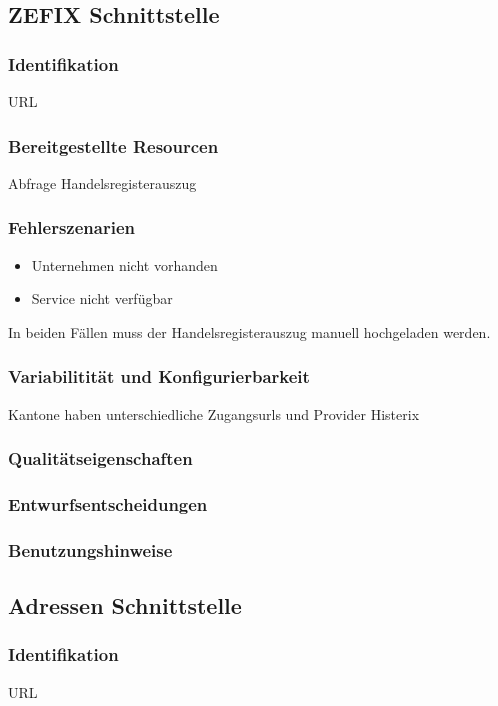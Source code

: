 \subsection{ZEFIX Schnittstelle}

\subsubsection{Identifikation}
URL
\subsubsection{Bereitgestellte Resourcen}
Abfrage Handelsregisterauszug

\subsubsection{Fehlerszenarien}
\begin{itemize}
	\item Unternehmen nicht vorhanden
	\item Service nicht verfügbar
\end{itemize}
In beiden Fällen muss der Handelsregisterauszug manuell hochgeladen werden.

\subsubsection{Variabilitität und Konfigurierbarkeit}
Kantone haben unterschiedliche Zugangsurls und Provider
Histerix

\subsubsection{Qualitätseigenschaften}

\subsubsection{Entwurfsentscheidungen} 

\subsubsection{Benutzungshinweise} 

\subsection{Adressen Schnittstelle}

\subsubsection{Identifikation}
URL

